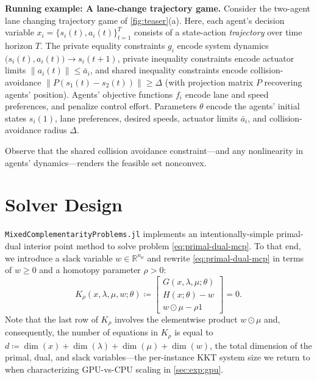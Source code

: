 \documentclass[conference]{IEEEtran}
\newcommand{\contentbox}[2]{
  \begin{mdframed}[backgroundcolor=black!5,linecolor=black!60,linewidth=0.5mm]
    \vspace{0.2mm}
    {\bf Running example: #1.} #2
  \end{mdframed}
}
\begin{document}
\contentbox{A lane-change trajectory game}{
  Consider the two-agent lane changing trajectory game of \cref{fig:teaser}(a).
  Here, each agent's decision variable $x_i = \{s_i(t), a_i(t)\}_{t = 1}^T$ consists of a state-action
  \emph{trajectory} over time horizon $T$. The private equality constraints
  $g_i$ encode system dynamics $\big(s_i(t), a_i(t)\big) \to s_i(t+1)$, private
  inequality constraints encode actuator limits $\|a_i(t)\| \le \bar a_i$, and
  shared inequality constraints encode collision-avoidance $\|P (s_1(t) - s_2(t))\|
  \ge \Delta$ (with projection matrix $P$ recovering agents' position).
  Agents' objective functions $f_i$ encode lane and speed preferences, and
  penalize control effort.
  Parameters $\theta$ encode the agents' initial states $s_i(1)$, lane
  preferences, desired speeds, actuator limits $\bar a_i$, and
  collision-avoidance radius $\Delta$.

  Observe that the shared collision avoidance constraint---and any nonlinearity in agents'
  dynamics---renders the feasible set nonconvex.
}

\section{Solver Design}
\label{sec:design}

\texttt{MixedComplementarityProblems.jl} implements an intentionally-simple
primal-dual interior point method to solve problem \cref{eq:primal-dual-mcp}.
To that end, we introduce a slack variable $w \in \mathbb{R}^{n_\mu}$ and rewrite
\cref{eq:primal-dual-mcp} in terms of $w \ge 0$ and a homotopy parameter $\rho >
0$:
\begin{equation}
\label{eq:slacked-mcp}
K_\rho(x, \lambda, \mu, w; \theta) \coloneqq \begin{bmatrix}
  G(x, \lambda, \mu; \theta) \\
  H(x; \theta) - w \\
  w \odot \mu - \rho 1
\end{bmatrix} = 0.
\end{equation}
Note that the last row of $K_\rho$ involves the elementwise product $w \odot
\mu$ and, consequently, the number of equations in $K_\rho$ is equal to
$d \coloneqq \dim(x) + \dim(\lambda) + \dim(\mu) + \dim(w)$, the total dimension of the
primal, dual, and slack variables---the per-instance KKT system size we return to when
characterizing GPU-vs-CPU scaling in \cref{sec:exp:gpu}.
\end{document}
